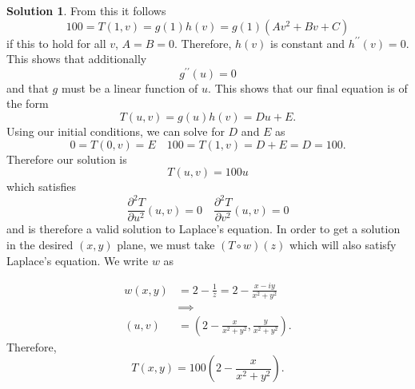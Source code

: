 \documentclass[12pt]{article}
\theoremstyle{definition}
\newtheorem{sol}{Solution}
\theoremstyle{remark}
\begin{document}
\begin{sol}
From this it follows 
\begin{equation*}
    100 = T(1,v) = g(1)h(v) = g(1)  (A v^{2} + Bv + C)
\end{equation*}
if this to hold for all $v$, $A = B = 0$. Therefore, $h(v)$ is constant and $h^{\prime \prime}(v) = 0$. This shows that additionally 
\begin{equation*}
    g^{\prime \prime}(u) = 0 
\end{equation*}
and that $g$ must be a linear function of $u$. This shows that our final equation is of the form
\begin{equation*}
    T(u,v) = g(u)h(v) = D u + E.
\end{equation*}
Using our initial conditions, we can solve for $D$ and $E$ as
\begin{equation*}
    0 = T(0,v) = E \quad 100 = T(1,v) = D + E = D = 100.
\end{equation*}
Therefore our solution is
\begin{equation*}
    T(u,v) = 100u
\end{equation*}
which satisfies 
\begin{equation*}
    \frac{\partial^{2} T}{\partial u^{2}}(u,v)  = 0 \quad  \frac{\partial^{2} T}{\partial v^{2}}(u,v) = 0
\end{equation*}
and is therefore a valid solution to Laplace's equation. In order to get a solution in the desired $(x,y)$ plane, we must take $(T \circ w)(z)$ which will also satisfy Laplace's equation. We write $w$ as 

\begin{align*}
    w(x,y) &= 2 - \frac{1}{z} = 2 - \frac{x-iy}{x^{2}+y^{2}} \\
     &\implies\\
    (u,v) &= (2-\frac{x}{x^{2}+y^{2}}, \frac{y}{x^{2}+y^{2}}).
\end{align*}
Therefore,
\begin{equation*}
T(x,y) = 100\left(2 - \frac{x}{x^{2}+y^{2}}\right).
\end{equation*}
\end{sol}
\end{document}
